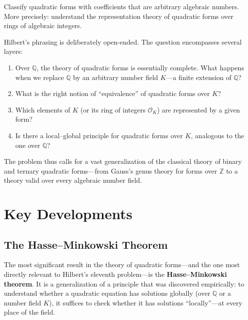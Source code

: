 \begin{problem_statement}
Classify quadratic forms with coefficients that are arbitrary algebraic numbers. More precisely: understand the representation theory of quadratic forms over rings of algebraic integers.
\end{problem_statement}

Hilbert's phrasing is deliberately open-ended. The question encompasses several layers:
\begin{enumerate}
    \item Over $\mathbb{Q}$, the theory of quadratic forms is essentially complete. What happens when we replace $\mathbb{Q}$ by an arbitrary number field $K$---a finite extension of $\mathbb{Q}$?
    \item What is the right notion of ``equivalence'' of quadratic forms over $K$?
    \item Which elements of $K$ (or its ring of integers $\mathcal{O}_K$) are represented by a given form?
    \item Is there a local--global principle for quadratic forms over $K$, analogous to the one over $\mathbb{Q}$?
\end{enumerate}

The problem thus calls for a vast generalization of the classical theory of binary and ternary quadratic forms---from Gauss's genus theory for forms over $\mathbb{Z}$ to a theory valid over every algebraic number field.

\section{Key Developments}

\subsection{The Hasse--Minkowski Theorem}

The most significant result in the theory of quadratic forms---and the one most directly relevant to Hilbert's eleventh problem---is the \textbf{Hasse--Minkowski theorem}. It is a generalization of a principle that was discovered empirically: to understand whether a quadratic equation has solutions globally (over $\mathbb{Q}$ or a number field $K$), it suffices to check whether it has solutions ``locally''---at every place of the field.

